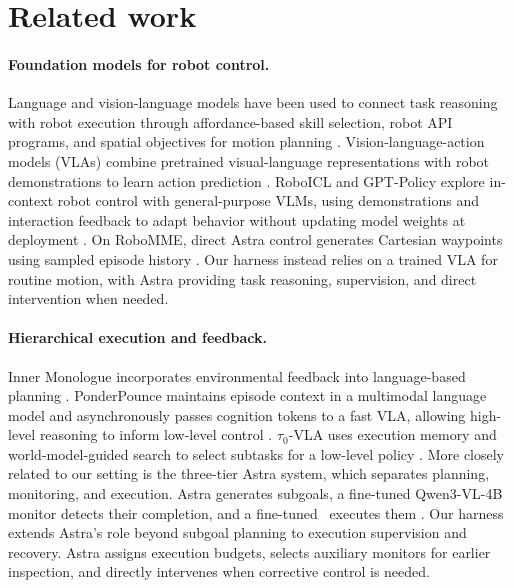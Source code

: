 \section{Related work}
\label{sec:related}

\paragraph{Foundation models for robot control.}
Language and vision-language models have been used to connect task reasoning with robot execution through affordance-based skill selection, robot API programs, and spatial objectives for motion planning . Vision-language-action models (VLAs) combine pretrained visual-language representations with robot demonstrations to learn action prediction . RoboICL and GPT-Policy explore in-context robot control with general-purpose VLMs, using demonstrations and interaction feedback to adapt behavior without updating model weights at deployment . On RoboMME, direct Astra control generates Cartesian waypoints using sampled episode history . Our harness instead relies on a trained VLA for routine motion, with Astra providing task reasoning, supervision, and direct intervention when needed.

\paragraph{Hierarchical execution and feedback.}
Inner Monologue incorporates environmental feedback into language-based planning . PonderPounce maintains episode context in a multimodal language model and asynchronously passes cognition tokens to a fast VLA, allowing high-level reasoning to inform low-level control . $\tau_0$-VLA uses execution memory and world-model-guided search to select subtasks for a low-level policy . More closely related to our setting is the three-tier Astra system, which separates planning, monitoring, and execution. Astra generates subgoals, a fine-tuned Qwen3-VL-4B monitor detects their completion, and a fine-tuned \pifive\ executes them . Our harness extends Astra's role beyond subgoal planning to execution supervision and recovery. Astra assigns execution budgets, selects auxiliary monitors for earlier inspection, and directly intervenes when corrective control is needed.


